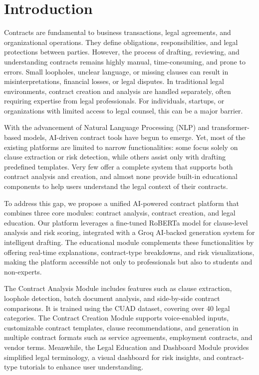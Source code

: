\section{Introduction}

Contracts are fundamental to business transactions, legal agreements, and organizational operations. They define obligations, responsibilities, and legal protections between parties. However, the process of drafting, reviewing, and understanding contracts remains highly manual, time-consuming, and prone to errors. Small loopholes, unclear language, or missing clauses can result in misinterpretations, financial losses, or legal disputes. In traditional legal environments, contract creation and analysis are handled separately, often requiring expertise from legal professionals. For individuals, startups, or organizations with limited access to legal counsel, this can be a major barrier.

With the advancement of Natural Language Processing (NLP) and transformer-based models, AI-driven contract tools have begun to emerge. Yet, most of the existing platforms are limited to narrow functionalities: some focus solely on clause extraction or risk detection, while others assist only with drafting predefined templates. Very few offer a complete system that supports both contract analysis and creation, and almost none provide built-in educational components to help users understand the legal context of their contracts.

To address this gap, we propose a unified AI-powered contract platform that combines three core modules: contract analysis, contract creation, and legal education. Our platform leverages a fine-tuned RoBERTa model for clause-level analysis and risk scoring, integrated with a Groq AI-backed generation system for intelligent drafting. The educational module complements these functionalities by offering real-time explanations, contract-type breakdowns, and risk visualizations, making the platform accessible not only to professionals but also to students and non-experts.

The Contract Analysis Module includes features such as clause extraction, loophole detection, batch document analysis, and side-by-side contract comparisons. It is trained using the CUAD dataset, covering over 40 legal categories. The Contract Creation Module supports voice-enabled inputs, customizable contract templates, clause recommendations, and generation in multiple contract formats such as service agreements, employment contracts, and vendor terms. Meanwhile, the Legal Education and Dashboard Module provides simplified legal terminology, a visual dashboard for risk insights, and contract-type tutorials to enhance user understanding.

